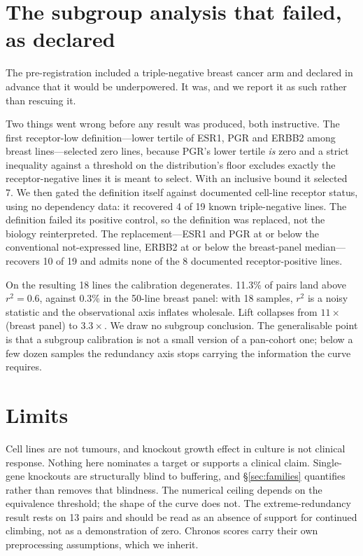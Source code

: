 \documentclass[11pt]{article}
\begin{document}
\section{The subgroup analysis that failed, as declared}

The pre-registration included a triple-negative breast cancer arm and
declared in advance that it would be underpowered. It was, and we report it
as such rather than rescuing it.

Two things went wrong before any result was produced, both instructive. The
first receptor-low definition---lower tertile of ESR1, PGR and ERBB2 among
breast lines---selected zero lines, because PGR's lower tertile \emph{is}
zero and a strict inequality against a threshold on the distribution's floor
excludes exactly the receptor-negative lines it is meant to select. With an
inclusive bound it selected 7. We then gated the definition itself against
documented cell-line receptor status, using no dependency data: it recovered
4 of 19 known triple-negative lines. The definition failed its positive
control, so the definition was replaced, not the biology reinterpreted. The
replacement---ESR1 and PGR at or below the conventional not-expressed line,
ERBB2 at or below the breast-panel median---recovers 10 of 19 and admits
none of the 8 documented receptor-positive lines.

On the resulting 18 lines the calibration degenerates. 11.3\% of pairs land
above $r^2 = 0.6$, against 0.3\% in the 50-line breast panel: with 18
samples, $r^2$ is a noisy statistic and the observational axis inflates
wholesale. Lift collapses from $11\times$ (breast panel) to $3.3\times$. We
draw no subgroup conclusion. The generalisable point is that a subgroup
calibration is not a small version of a pan-cohort one; below a few dozen
samples the redundancy axis stops carrying the information the curve
requires.

\section{Limits}

Cell lines are not tumours, and knockout growth effect in culture is not
clinical response. Nothing here nominates a target or supports a clinical
claim. Single-gene knockouts are structurally blind to buffering, and
\S\ref{sec:families} quantifies rather than removes that blindness. The
numerical ceiling depends on the equivalence threshold; the shape of the
curve does not. The extreme-redundancy result rests on 13 pairs and should
be read as an absence of support for continued climbing, not as a
demonstration of zero. Chronos scores carry their own preprocessing
assumptions, which we inherit.
\end{document}
